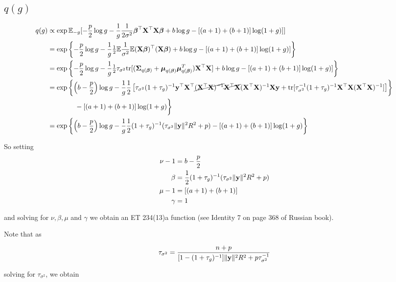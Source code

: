 \documentclass{amsart}[12pt]
\begin{document}
\subsection{$q(g)$}
\begin{align*}
q(g) &\propto \exp \mathbb{E}_{-g} [-\frac{p}{2} \log g - \frac{1}{g} \frac{1}{2 \sigma^2} {\boldsymbol \beta}^\top {\bf X}^\top {\bf X} {\boldsymbol\beta} + b \log g - [(a + 1) + (b + 1)] \log(1 + g) ]] \\
&= \exp \left \{ -\frac{p}{2} \log g - \frac{1}{g} \tfrac{1}{2} \mathbb{E} \frac{1}{\sigma^2} \mathbb{E} ({\bf X} {\boldsymbol \beta})^\top ({\bf X} {\boldsymbol \beta}) + b \log g - [(a + 1) + (b + 1)] \log(1 + g) ] \right \} \\
&= \exp \left \{ -\frac{p}{2} \log g - \frac{1}{g} \tfrac{1}{2} \tau_{\sigma^2} \text{tr}[({\boldsymbol \Sigma}_{q({\boldsymbol \beta})} + {\boldsymbol \mu}_{q({\boldsymbol \beta})} {\boldsymbol \mu}_{q({\boldsymbol \beta})}^T) {\bf X}^\top {\bf X}] + b \log g - [(a + 1) + (b + 1)] \log(1 + g) ] \right \} \\
&= \exp \left \{ \left(b - \frac{p}{2}\right) \log g - \frac{1}{g} \frac{1}{2} \left[\tau_{\sigma^2} (1 + \tau_g)^{-1} {\bf y}^\top {\bf X}^\top \cancel{({\bf X}^\top {\bf X})^{-1}} \cancel{{\bf X}^\top {\bf X}} ({\bf X}^\top {\bf X})^{-1} {\bf X} {\bf y} + \text{tr}{[\tau_{\sigma^2}^{-1} (1 + \tau_g)^{-1} {\bf X}^\top {\bf X}({\bf X}^\top {\bf X})^{-1}]} \right] \right \} \\
& \quad \quad \qquad	- [(a + 1) + (b + 1)] \log(1 + g)  \biggl \} \\
&= \exp \left \{ \left(b - \frac{p}{2}\right) \log g - \frac{1}{g} \frac{1}{2} (1 + \tau_g)^{-1} (\tau_{\sigma^2} \|{\bf y}\|^2 R^2 + p)
	- [(a + 1) + (b + 1)] \log(1 + g)  \right \}
\end{align*}

So setting
\begin{align*}
\nu - 1 &= b - \frac{p}{2} \\
\beta &= \frac{1}{2} (1 + \tau_g)^{-1} (\tau_{\sigma^2} \|{\bf y}\|^2 R^2 + p) \\
\mu - 1 &= [(a + 1) + (b + 1)] \\
\gamma &= 1
\end{align*}

and solving for $\nu, \beta, \mu$ and $\gamma$ we obtain an ET 234(13)a function (see Identity 7 on page 368
of Russian book).

Note that as

\begin{align*}
\tau_{\sigma^2} = \frac{n + p}{[1 - (1 + \tau_g)^{-1}]\|{\bf y}\|^2 R^2 + p \tau_{\sigma^2}^{-1}}
\end{align*}

solving for $\tau_{\sigma^2}$, we obtain
\end{document}
